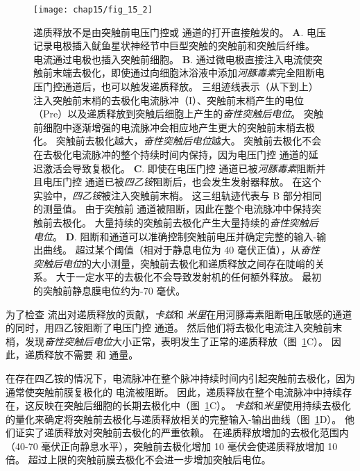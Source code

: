 \begin{figure}[htbp]
	\centering
	\texttt{[image: chap15/fig\_15\_2]}
	\caption{递质释放不是由突触前电压门控或  通道的打开直接触发的\cite{katz1967study}。
	\textbf{A}. 电压记录电极插入鱿鱼星状神经节中巨型突触的突触前和突触后纤维。
	电流通过电极也插入突触前细胞。
	\textbf{B}. 通过微电极直接注入电流使突触前末端去极化，即使通过向细胞沐浴液中添加\textit{河豚毒素}完全阻断电压门控通道后，也可以触发递质释放。
	三组迹线表示（从下到上）注入突触前末梢的去极化电流脉冲（I）、突触前末梢产生的电位（Pre）以及递质释放到突触后细胞上产生的\textit{奋性突触后电位}。
	突触前细胞中逐渐增强的电流脉冲会相应地产生更大的突触前末梢去极化。
	突触前去极化越大，\textit{奋性突触后电位}越大。
	突触前去极化不会在去极化电流脉冲的整个持续时间内保持，因为电压门控  通道的延迟激活会导致复极化。
	\textbf{C}. 即使在电压门控  通道已被\textit{河豚毒素}阻断并且电压门控  通道已被\textit{四乙铵}阻断后，也会发生发射器释放。
	在这个实验中，\textit{四乙铵}被注入突触前末梢。
	这三组轨迹代表与 B 部分相同的测量值。
	由于突触前  通道被阻断，因此在整个电流脉冲中保持突触前去极化。
	大量持续的突触前去极化产生大量持续的\textit{奋性突触后电位}。
	\textbf{D}. 阻断和通道可以准确控制突触前电压并确定完整的输入-输出曲线。
	超过某个阈值（相对于静息电位为 40 毫伏正值），从\textit{奋性突触后电位}的大小测量，突触前去极化和递质释放之间存在陡峭的关系。
	大于一定水平的去极化不会导致发射机的任何额外释放。
	最初的突触前静息膜电位约为-70 毫伏。}
	\label{fig:15_2}
\end{figure}


为了检查  流出对递质释放的贡献，\textit{卡兹}和 \textit{米里}在用河豚毒素阻断电压敏感的通道的同时，用四乙铵阻断了电压门控  通道。
然后他们将去极化电流注入突触前末梢，发现\textit{奋性突触后电位}大小正常，表明发生了正常的递质释放（图~\ref{fig:15_2}C）。
因此，递质释放不需要  和  通量。


在存在四乙铵的情况下，电流脉冲在整个脉冲持续时间内引起突触前去极化，因为通常使突触前膜复极化的  电流被阻断。
因此，递质释放在整个电流脉冲中持续存在，这反映在突触后细胞的长期去极化中（图~\ref{fig:15_2}C）。
\textit{卡兹}和\textit{米里}使用持续去极化的量化来确定将突触前去极化与递质释放相关的完整输入-输出曲线（图~\ref{fig:15_2}D）。
他们证实了递质释放对突触前去极化的严重依赖。
在递质释放增加的去极化范围内（40-70 毫伏正向静息水平），突触前去极化增加 10 毫伏会使递质释放增加 10 倍。
超过上限的突触前膜去极化不会进一步增加突触后电位。



